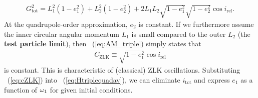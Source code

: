 \documentclass[main.tex]{subfiles}
\begin{document}
\begin{tcolorbox}[sharp corners, colback=green!30, colframe=green!80!blue, title=Box \ref{boxchap3:dynVI} -- Orbital dynamics VI (continued)]
{\begin{align}
\label{eq:AM_triple}
G_\mathrm{tot}^2 = L_1^2 \left(1-e_1^2 \right ) + L_2^2 \left(1-e_2^2 \right ) + 2L_1 L_2 \sqrt{1-e_1^2} \sqrt{1-e_2^2} \cos i_\mathrm{rel}.
\end{align}}
At the quadrupole-order approximation, $e_2$ is constant. If we furthermore assume the inner circular angular momentum $L_1$ is small compared to the outer $L_2$ (the {\bf test particle limit}), then \Eq~(\ref{eq:AM_triple}) simply states that
\begin{align}
\label{eq:cZLK}
C_\mathrm{ZLK} \equiv \sqrt{1-e_1^2} \cos i_\mathrm{rel}
\end{align}
is constant. This is characteristic of (classical) ZLK oscillations. Substituting \Eq~(\ref{eq:cZLK}) into \Eq~(\ref{eq:Htriplequadav}), we can eliminate $i_\mathrm{tot}$ and express $e_1$ as a function of $\omega_1$ for given initial conditions. 
\end{tcolorbox}
\end{document}
